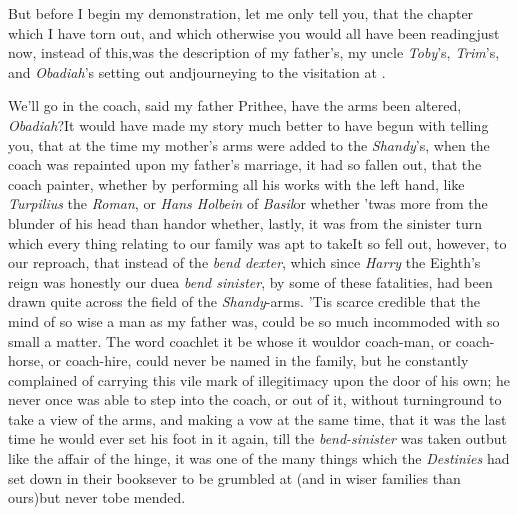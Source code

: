 \documentclass{article}
\begin{document}
But before I begin my demonstration, let me only tell you,
that the chapter which I have torn out, and which otherwise
you would all have been reading\break just now, instead of
this,\tsk was the description of my father’s, my uncle
\textit{Toby}’s, \textit{Trim}’s, and \textit{Obadiah}’s
setting out and\break journeying to the visitation at
\hbox{\astiv}.

We’ll go in the coach, said my father\break
\tsk Prithee, have the arms been altered,
\textit{Obadiah}?\tsk It would have made my story much
better to have begun with telling you, that at the time my
mother’s arms were added to the \textit{Shandy}’s, when the
coach was repainted upon my father’s marriage, it had so
fallen out, that the coach painter, whether by performing all
his works with the left hand, like\break
\textit{Turpilius} the
\textit{Roman}, or \textit{Hans Holbein} of
\textit{Basil}\tsk or whether ’twas more from the blunder of
his head than hand\tsk or whe\-ther, lastly, it was from the
sinister turn which every thing relating to our family was
apt to take\tsk It so fell out, however, to our reproach,
that instead of the \textit{bend dexter}, which since
\textit{Harry} the Eighth’s reign was honestly our due\tsk a
\textit{bend sinister}, by some of these fatalities, had
been drawn quite across the field of the \textit{Shandy}-arms. 
’Tis scarce credible that the mind of so wise a man as
my father was, could be so much incommoded with so small a
matter. The word coach\tsk let it be whose it would\tsk or
coach-man, or coach-horse, or coach-hire, could never be
named in the family, but he constantly complained of
carrying this vile mark of illegitimacy upon the door of his
own; he never once was able to step into the coach, or out
of it, without turning\break round to take a view of the arms, and
making a vow at the same time, that it was the last time he
would ever set his foot in it again, till the
\textit{bend-sinister} was taken out\tsk but like the affair
of the hinge, it was one of the many things which the
\textit{Destinies} had set down in their books\tsk ever to be
grumbled at (and in wiser families than ours)\tsk but never
to\break be mended.
\end{document}
